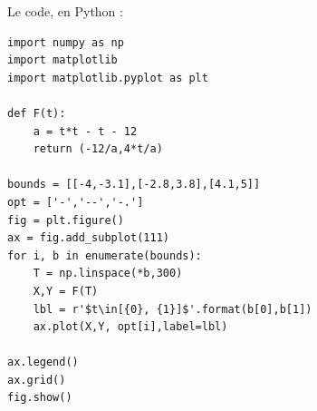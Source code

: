 \documentclass{article}
\theoremstyle{definition}
\begin{document}
Le code, en {\sffamily Python} :

\begin{lstlisting}
import numpy as np
import matplotlib
import matplotlib.pyplot as plt

def F(t):
    a = t*t - t - 12
    return (-12/a,4*t/a)

bounds = [[-4,-3.1],[-2.8,3.8],[4.1,5]]
opt = ['-','--','-.']
fig = plt.figure()
ax = fig.add_subplot(111)
for i, b in enumerate(bounds):
    T = np.linspace(*b,300)
    X,Y = F(T)
    lbl = r'$t\in[{0}, {1}]$'.format(b[0],b[1])
    ax.plot(X,Y, opt[i],label=lbl)

ax.legend()
ax.grid()
fig.show()
\end{lstlisting}
\end{document}
